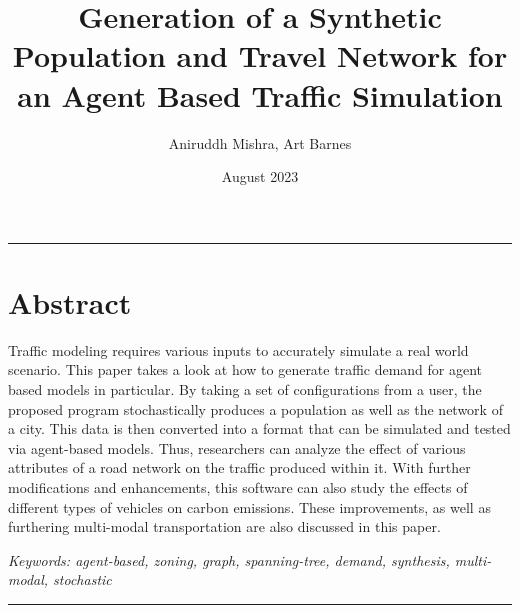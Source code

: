 \documentclass[11pt]{article}
\title{\vspace{-5em}\Huge Generation of a Synthetic Population and Travel Network for an Agent Based Traffic Simulation}
\author{\small Aniruddh Mishra, Art Barnes}
\affil{\textit{Institute for Computing in Research}}
\date{\vspace{-0.9em}\small August 2023}
\begin{document}
\maketitle

\hrule

\section*{Abstract}

\quad Traffic modeling requires various inputs to accurately simulate a real world scenario. This paper takes a look at how to generate traffic demand for agent based models in particular. By taking a set of configurations from a user, the proposed program stochastically produces a population as well as the network of a city. This data is then converted into a format that can be simulated and tested via agent-based models. Thus, researchers can analyze the effect of various attributes of a road network on the traffic produced within it. With further modifications and enhancements, this software can also study the effects of different types of vehicles on carbon emissions. These improvements, as well as furthering multi-modal transportation are also discussed in this paper.

\vspace{1em}

\raggedright\textit{Keywords: agent-based, zoning, graph, spanning-tree, demand, synthesis, multi-modal, stochastic}

\vspace{1em}

\hrule

\vspace{0.7em}
\end{document}
